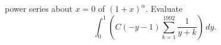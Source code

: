 power series about $x=0$ of $(1 + x)^\alpha$. Evaluate
\[
\int_0^1 \left( C(-y-1) \sum_{k=1}^{1992} \frac{1}{y+k} \right)\,dy.
\]
